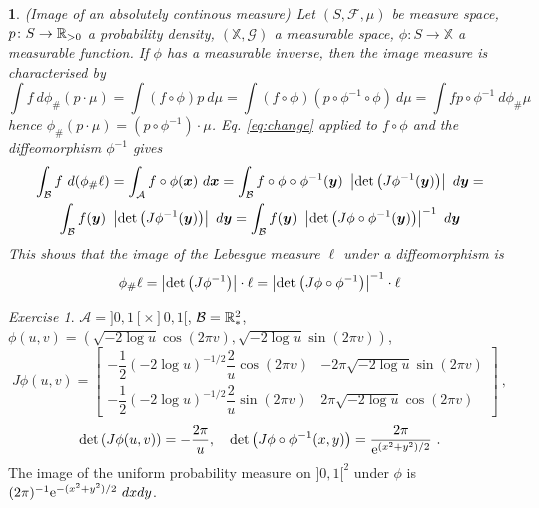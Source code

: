 \documentclass[12pt,a4paper]{amsart}
\newcommand{\by}{\bm y}
\theoremstyle{plain}%
\newtheorem{npar}{}%
\theoremstyle{definition}
\theoremstyle{remark}
\newtheorem{exercise}{Exercise}
\begin{document}
\begin{npar}(Image of an absolutely continous measure)\normalfont
  Let $(S,\mathcal F,\mu)$ be measure space, $p \colon S \to \mathbb{R}_{>0}$ a probability density, $(\mathbb X,\mathcal G)$ a measurable space, $\phi \colon S \to \mathbb X$ a measurable function. If $\phi$ has a measurable inverse, then the image measure is characterised by
  \begin{equation*}
    \int f \ d\phi_{\#}(p \cdot \mu) = \int (f\circ \phi) p \ d\mu = \int (f\circ\phi) (p\circ\phi^{-1}\circ\phi) \ d\mu = \int f p\circ\phi^{-1} \  d\phi_{\#} \mu 
  \end{equation*}
hence $\phi_{\#}(p \cdot \mu) = (p\circ\phi^{-1})\cdot\mu$. Eq. \eqref{eq:change}
applied to $f \circ \phi$ and the diffeomorphism $\phi^{-1}$ gives 
\begin{multline*}
  \int_{\mathcal B} f \ d(\phi_{\#}\ell) = \int_{\mathcal A} f\circ\phi(\bx) \ d\bx = \int_{\mathcal B} f\circ\phi\circ\phi^{-1}(\by) \ \absoluteval{\detof{J\phi^{-1}(\by)}} \ d\by = \\ \int_{\mathcal B} f(\by) \ \absoluteval{\detof{J\phi^{-1}(\by)}} \ d\by = \int_{\mathcal B} f(\by) \ \absoluteval{\detof{J\phi\circ\phi^{-1}(\by)}}^{-1} \ d\by
\end{multline*}
This shows that the image of the Lebesgue measure $\ell$ under a diffeomorphism is
\begin{equation*}%
  \phi_{\#}\ell = \absoluteval{\detof{J\phi^{-1}}}\cdot\ell = \absoluteval{\detof{J\phi\circ\phi^{-1}}}^{-1} \cdot \ell  
\end{equation*}
\end{npar}
\begin{exercise}
  $\mathcal A = ]0,1[\times ]0,1[$, $\mathcal B = \mathbb{R}^2_*$, $\phi(u,v)=(\sqrt{-2\log u}\cos(2\pi v),\sqrt{-2\log u}\sin(2\pi v))$,
\begin{equation*}
  J\phi(u,v) =
  \begin{bmatrix}
    - \dfrac12 (-2 \log u)^{-1/2} \dfrac {2}{u} \cos(2\pi v) & - 2\pi \sqrt{- 2\log u} \sin(2\pi v) \\ - \dfrac12 (-2 \log u)^{-1/2} \dfrac {2}{u} \sin(2\pi v) & 2\pi \sqrt{-2\log u} \cos(2\pi v)
  \end{bmatrix} \ ,
\end{equation*}
\begin{equation*}
  \operatorname{det}\left(J\phi(u,v)\right) = - \frac {2\pi}{u}, \quad \operatorname{det}\left(J\phi\circ\phi^{-1}(x,y)\right) = \frac{2\pi}{\mathrm{e}^{(x^2+y^2)/2}} \ .
\end{equation*}
The image of the uniform probability measure on $]0,1[^2$ under $\phi$ is $(2\pi)^{-1} \mathrm{e}^{-(x^2+y^2)/2} \ dxdy$.
\end{exercise}
\end{document}
